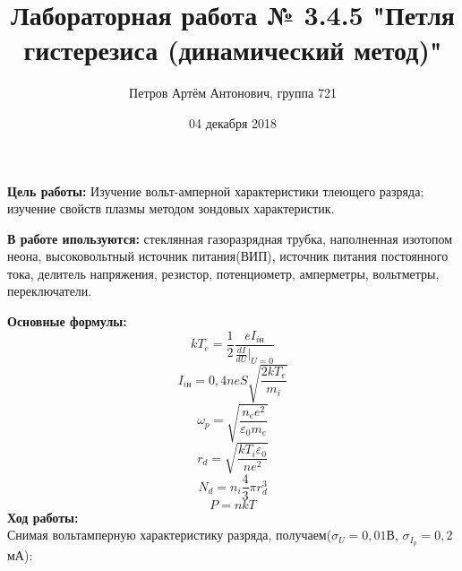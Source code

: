 \documentclass[a4paper]{article}
\author{Петров Артём Антонович, группа 721}
\title{Лабораторная работа № 3.4.5 "Петля гистерезиса (динамический метод)"}
\date{04 декабря 2018}
\begin{document}
\maketitle

\textbf{Цель работы:} Изучение вольт-амперной характеристики тлеющего разряда; изучение свойств плазмы методом зондовых характеристик.

\textbf{В работе ипользуются:} стеклянная газоразрядная трубка, наполненная изотопом неона, высоковольтный источник питания(ВИП), источник питания постоянного тока, делитель напряжения, резистор, потенциометр, амперметры, вольтметры, переключатели.
 
\textbf{Основные формулы:}
\begin{equation}
	kT_e = \frac{1}{2} \frac{e I_{i\mbox{н}}}{\frac{dI}{dU}|_{U=0}}
\end{equation}
\begin{equation}
	I_{i\mbox{н}} =  0,4 n e S \sqrt{\frac{2kT_e}{m_i}}
\end{equation}
\begin{equation}
	\omega_p = \sqrt{\frac{n_e e^2}{\varepsilon_0 m_e}}
\end{equation}
\begin{equation}
	r_d = \sqrt{\frac{k T_i \varepsilon_0}{n e^2}}
\end{equation}
\begin{equation}
	N_d = n_i \frac{4}{3} \pi r_d^3
\end{equation}
\begin{equation}
	P = nkT
\end{equation}
\textbf{Ход работы:}\\
Снимая вольтамперную характеристику разряда, получаем($\sigma_U = 0,01$В, $\sigma_{I_p} = 0,2$мА):
\end{document}
